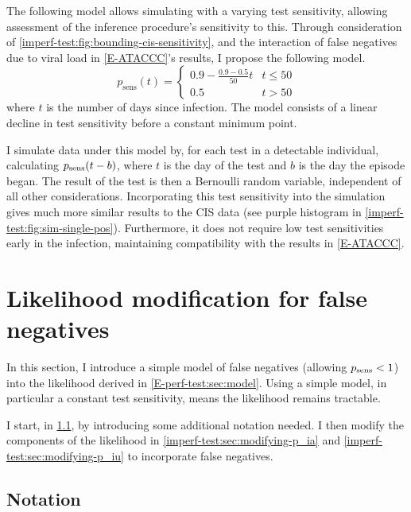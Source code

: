 \documentclass[thesis.tex]{subfiles}
\begin{document}
The following model allows simulating with a varying test sensitivity, allowing assessment of the inference procedure's sensitivity to this.
Through consideration of \cref{imperf-test:fig:bounding-cis-sensitivity}, and the interaction of false negatives due to viral load in \cref{E-ATACCC}'s results, I propose the following model.
\begin{equation}
  p_\text{sens}(t) = \begin{cases}
    0.9 - \frac{0.9-0.5}{50}t &t \leq 50 \\
    0.5 &t > 50
  \end{cases}
  \label{imperf-test:eq:variable-test-sensitivity}
\end{equation}
where $t$ is the number of days since infection.
The model consists of a linear decline in test sensitivity before a constant minimum point.

I simulate data under this model by, for each test in a detectable individual, calculating $p_\text{sens}(t-b)$, where $t$ is the day of the test and $b$ is the day the episode began.
The result of the test is then a Bernoulli random variable, independent of all other considerations.
Incorporating this test sensitivity into the simulation gives much more similar results to the CIS data (see purple histogram in \cref{imperf-test:fig:sim-single-pos}).
Furthermore, it does not require low test sensitivities early in the infection, maintaining compatibility with the results in \cref{E-ATACCC}.

\section{Likelihood modification for false negatives} \label{imperf-test:sec:modelling}

In this section, I introduce a simple model of false negatives (\ie allowing $p_\text{sens} < 1$) into the likelihood derived in \cref{E-perf-test:sec:model}.
Using a simple model, in particular a constant test sensitivity, means the likelihood remains tractable.

I start, in \cref{imperf-test:sec:notation}, by introducing some additional notation needed.
I then modify the components of the likelihood in \cref{imperf-test:sec:modifying-p_ia} and \cref{imperf-test:sec:modifying-p_iu} to incorporate false negatives.

\subsection{Notation} \label{imperf-test:sec:notation}
\end{document}
